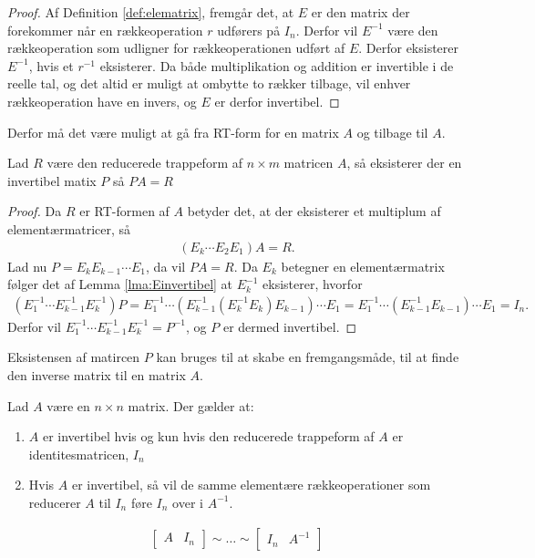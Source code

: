 \begin{proof}
Af Definition \ref{def:elematrix}, fremgår det, at $E$ er den matrix der forekommer når en rækkeoperation $r$ udførers på $I_n$. Derfor vil $E^{-1}$ være den rækkeoperation som udligner for rækkeoperationen udført af $E$.
Derfor eksisterer $E^{-1}$, hvis et $r^{-1}$ eksisterer. 
Da både multiplikation og addition er invertible i de reelle tal, og det altid er muligt at ombytte to rækker tilbage, vil enhver rækkeoperation have en invers, og $E$ er derfor invertibel.
\end{proof}
Derfor må det være muligt at gå fra RT-form for en matrix $A$ og tilbage til $A$.
\begin{lma}
Lad $R$ være den reducerede trappeform af $n\times m$ matricen $A$, så eksisterer der en invertibel matix $P$ så $PA = R$
\label{lma:PA=R}
\end{lma}
\begin{proof}
Da $R$ er RT-formen af $A$ betyder det, at der eksisterer et multiplum af elementærmatricer, så
\begin{align*}
\left( E_k \dotsm E_2 E_1 \right) A = R.
\end{align*}
Lad nu $P = E_k E_{k-1} \dotsm E_1$, da vil $PA = R$.
Da $E_k$ betegner en elementærmatrix følger det af Lemma \ref{lma:Einvertibel} at $E_k^{-1}$ eksisterer, hvorfor 
\begin{align*}
\left( E_1^{-1}\dotsm E_{k-1}^{-1} E_k^{-1} \right) P = E_1^{-1}\dotsm \left( E_{k-1}^{-1}\left( E_k^{-1}E_k \right) E_{k-1}\right)\dotsm E_1 = E_1^{-1}\dotsm \left( E_{k-1}^{-1}  E_{k-1} \right) \dotsm E_1 = I_n.
\end{align*}
Derfor vil $E_1^{-1}\dotsm E_{k-1}^{-1} E_k^{-1} = P^{-1}$, og $P$ er dermed invertibel.
\end{proof}
Eksistensen af matircen $P$ kan bruges til at skabe en fremgangsmåde, til at finde den inverse matrix til en matrix $A$.
\begin{stn}
Lad $A$ være en $n \times n$ matrix. Der gælder at: 
\begin{enumerate}[label=(\alph*)]
\item $A$ er invertibel hvis og kun hvis den reducerede trappeform af $A$ er identitesmatricen, $I_n$
\item Hvis $A$ er invertibel, så vil de samme elementære rækkeoperationer som reducerer $A$ til $I_n$ føre $I_n$ over i $A^{-1}$.  
\end{enumerate}
\begin{align*}
\begin{bmatrix}
A & I_n
\end{bmatrix} \sim \dots \sim
\begin{bmatrix}
I_n & A^{-1}
\end{bmatrix}
\end{align*}
\label{stn:inversmatrix}
\end{stn}
